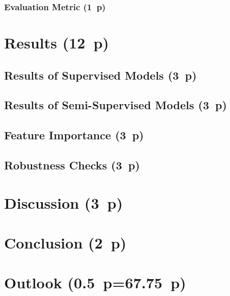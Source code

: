 \subsubsection{Evaluation Metric (1~p)}\label{sec:evaluation-metric}

\newpage
\section{Results (12~p)}\label{sec:results}

\subsection{Results of Supervised
  Models (3~p)}\label{sec:results-of-supervised-models}

\subsection{Results of Semi-Supervised
  Models (3~p)}\label{sec:results-of-semi-supervised-models}

\subsection{Feature Importance (3~p)}\label{sec:feature-importance}

\subsection{Robustness Checks (3~p)}\label{sec:robustness-checks}

\newpage
\section{Discussion (3~p)}\label{sec:discussion}

\newpage
\section{Conclusion (2~p)}\label{sec:conclusion}

\newpage
\section{Outlook (0.5~p=67.75~p)}\label{sec:outlook}

